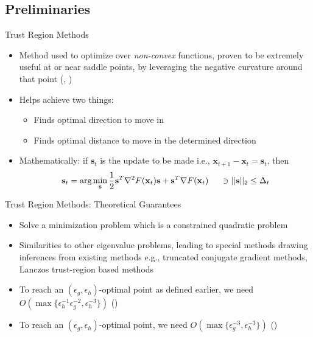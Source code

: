 \documentclass[10pt]{beamer}
\newcommand{\h}{\nabla^{2}}
\newcommand{\g}{\nabla}
\newcommand{\xbold}{\mathbf{x}}
\newcommand{\sbold}{\mathbf{s}}
\newcommand{\eg}{\epsilon_{g}}
\newcommand{\eh}{\epsilon_{h}}
\begin{document}
\subsection{Preliminaries}
\begin{frame}{Trust Region Methods}
\begin{itemize}
\item<1->{Method used to optimize over \emph{non-convex} functions, proven to be extremely useful at or near saddle points, by leveraging the negative curvature around that point (\cite{conn-siam}, \cite{sorensen-siam})}
\item<2->{Helps achieve two things:
  \begin{itemize}
    \item<3->Finds optimal direction to move in
    \item<4->Finds optimal distance to move in the determined direction
  \end{itemize}
  }
\item<5->{Mathematically: if \(\sbold_{t}\) is the update to be made i.e., \(\xbold_{t+1} - \xbold_{t} = \sbold_{t}\), then
\begin{equation}
\label{TR}
\sbold_{t} = \text{arg}\min_{\sbold} \frac{1}{2}\sbold^{T} \h F(\xbold_{t}) \sbold + \sbold^{T} \g F(\xbold_{t}) \hspace{5mm}\ni ||\sbold||_{2} \leq \Delta_{t}
\end{equation} %
}
\end{itemize}
\end{frame}

\begin{frame}{Trust Region Methods: Theoretical Guarantees}
\begin{itemize}
\item<1->{Solve a minimization problem which is a constrained quadratic problem}
\item<2->{Similarities to other eigenvalue problems, leading to special methods drawing inferences from existing methods e.g., truncated conjugate gradient methods, Lanczos trust-region based methods}
\item<3->{To reach an \((\eg, \eh)\)-optimal point as defined earlier, we need \(O\left(\max\{\eh^{-1}\eg^{-2}, \eh^{-3}\}\right)\) (\cite{cartis-joc})} 
\item<4->{To reach an \((\eg, \eh)\)-optimal point, we need \(O\left(\max\{\eg^{-3}, \eh^{-3}\}\right)\) (\cite{geovani-oms})}
\end{itemize}
\end{frame}
\end{document}

